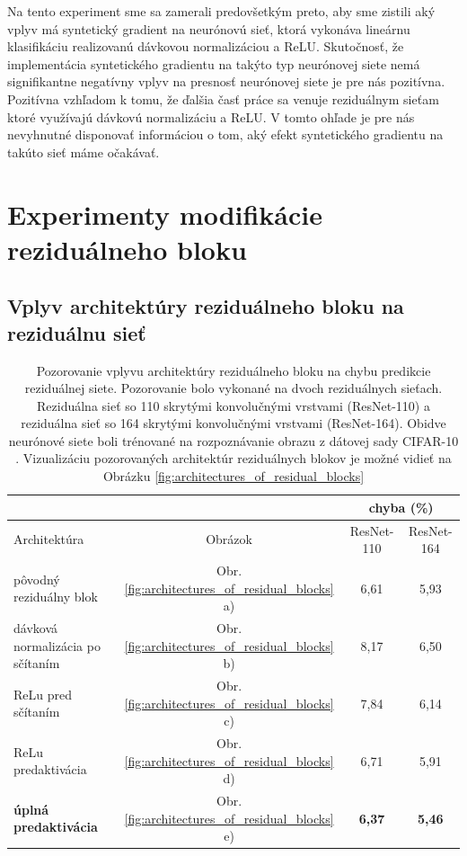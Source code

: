 Na tento experiment sme sa zamerali predovšetkým preto, aby sme zistili aký vplyv má syntetický gradient na neurónovú sieť, ktorá vykonáva lineárnu klasifikáciu realizovanú dávkovou normalizáciou a ReLU. Skutočnosť, že implementácia syntetického gradientu na takýto typ neurónovej siete nemá signifikantne negatívny vplyv na presnosť neurónovej siete je pre nás pozitívna. Pozitívna vzhľadom k tomu, že ďalšia časť práce sa venuje reziduálnym sieťam ktoré využívajú dávkovú normalizáciu a ReLU. V tomto ohľade je pre nás nevyhnutné disponovať informáciou o tom, aký efekt syntetického gradientu na takúto sieť máme očakávať.

\chapter{Experimenty modifikácie reziduálneho bloku}

\section{Vplyv architektúry reziduálneho bloku na reziduálnu sieť}

\begin{table}[h]
\caption[Porovnanie architektúr reziduálneho bloku]{Pozorovanie vplyvu architektúry reziduálneho bloku na chybu predikcie reziduálnej siete. Pozorovanie bolo vykonané na dvoch reziduálnych sieťach. Reziduálna sieť so 110 skrytými konvolučnými vrstvami (ResNet-110) a reziduálna sieť so 164 skrytými konvolučnými vrstvami (ResNet-164). Obidve neurónové siete boli trénované na rozpoznávanie obrazu z dátovej sady CIFAR-10 \cite{He2016}. Vizualizáciu pozorovaných architektúr reziduálnych blokov je možné vidieť na Obrázku \ref{fig:architectures_of_residual_blocks}}
\label{compareArchitectures}
\begin{center}
\begin{tabular}{l|c|c|c}
\toprule
\multicolumn{2}{c}{} & \multicolumn{2}{c}{chyba (\%)} \\
\midrule
Architektúra & Obrázok & ResNet-110  & ResNet-164\\ \hline
\hline
pôvodný reziduálny blok          & Obr. \ref{fig:architectures_of_residual_blocks} a) & 6,61 & 5,93 \\
dávková normalizácia po sčítaním & Obr. \ref{fig:architectures_of_residual_blocks} b) & 8,17 & 6,50 \\
ReLu pred sčítaním               & Obr. \ref{fig:architectures_of_residual_blocks} c) & 7,84 & 6,14 \\
ReLu predaktivácia               & Obr. \ref{fig:architectures_of_residual_blocks} d) & 6,71 & 5,91 \\
\textbf{úplná predaktivácia}     & Obr. \ref{fig:architectures_of_residual_blocks} e) & \textbf{6,37} & \textbf{5,46} \\
\hline
\bottomrule
\end{tabular}%
\end{center}
\end{table}
\newpage

